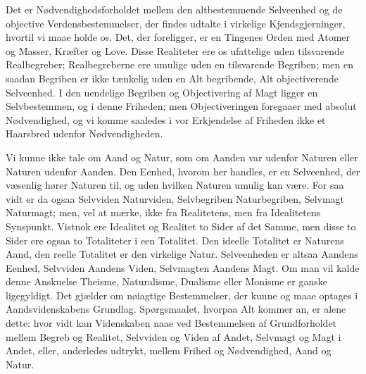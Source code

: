 \documentclass[12pt]{book}
\newcommand{\apage}[1]{\marginnote{\footnotesize\textit{[#1]}}}
\begin{document}
Det er Nødvendighedsforholdet mellem den altbestemmende Selveenhed og de
objective Verdensbestemmelser, der findes udtalte i virkelige
Kjendsgjerninger, hvortil vi maae holde os. Det, der foreligger, er en
Tingenes Orden med Atomer og Masser, Kræfter og Love. Disse Realiteter ere
os ufattelige uden tilsvarende Realbegreber; Realbegreberne ere umulige uden
en tilsvarende Begriben; men en saadan Begriben er ikke tænkelig uden en
Alt begribende, Alt objectiverende Selveenhed. I den uendelige Begriben og
Objectivering af Magt ligger en Selvbestemmen, og i denne Friheden; men
Objectiveringen foregaaer med absolut Nødvendighed, og vi komme saaledes i
vor Erkjendelse af Friheden ikke et Haarsbred udenfor Nødvendigheden.

Vi kunne ikke tale om Aand og Natur, som om Aanden var udenfor Naturen
eller Naturen udenfor Aanden. Den Eenhed, hvorom her handles, er en
Selveenhed, der væsenlig hører Naturen til, og uden hvilken Naturen umulig
kan være. For saa vidt er da \apage{228} ogsaa Selvviden Naturviden, Selvbegriben
Naturbegriben, Selvmagt Naturmagt; men, vel at mærke, ikke fra Realitetens,
men fra Idealitetens Synspunkt. Vistnok ere Idealitet og Realitet to Sider
af det Samme, men disse to Sider ere ogsaa to Totaliteter i een Totalitet.
Den ideelle Totalitet er Naturens Aand, den reelle Totalitet er den
virkelige Natur. Selveenheden er altsaa Aandens Eenhed, Selvviden Aandens
Viden, Selvmagten Aandens Magt. Om man vil kalde denne Anskuelse Theisme,
Naturalisme, Dualisme eller Monisme er ganske ligegyldigt. Det gjælder om
nøiagtige Bestemmelser, der kunne og maae optages i Aandsvidenskabens
Grundlag. Spørgsmaalet, hvorpaa Alt kommer an, er alene dette: hvor vidt kan
Videnskaben naae ved Bestemmelsen af Grundforholdet mellem Begreb og
Realitet, Selvviden og Viden af Andet, Selvmagt og Magt i Andet, eller,
anderledes udtrykt, mellem Frihed og Nødvendighed, Aand og Natur.
\end{document}
